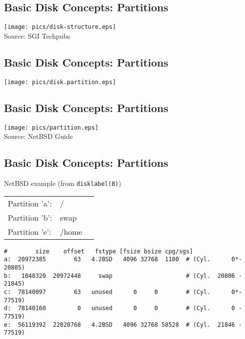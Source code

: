 \documentclass[xga]{xdvislides}
\begin{document}
\subsection{Basic Disk Concepts: Partitions}
	\begin{center}
		\texttt{[image: pics/disk-structure.eps]} \\
		\tiny Source: SGI Techpubs \\
	\end{center}

\subsection{Basic Disk Concepts: Partitions}
	\begin{center}
		\texttt{[image: pics/disk.partition.eps]}
	\end{center}


\subsection{Basic Disk Concepts: Partitions}
	\begin{center}
		\texttt{[image: pics/partition.eps]} \\
		\tiny Source: NetBSD Guide \\
	\end{center}

\subsection{Basic Disk Concepts: Partitions}
NetBSD example (from {\tt disklabel(8)})

\begin{tabular}{ l l c }
Partition 'a': & / & \\
Partition 'b': & swap & \\
Partition 'e': & /home & \\
\end{tabular}

\begin{verbatim}
#        size    offset   fstype [fsize bsize cpg/sgs]
a:  20972385        63   4.2BSD   4096 32768  1180  # (Cyl.      0*- 20805)
b:   1048320  20972448     swap                     # (Cyl.  20806 - 21845)
c:  78140097        63   unused      0     0        # (Cyl.      0*- 77519)
d:  78140160         0   unused      0     0        # (Cyl.      0 - 77519)
e:  56119392  22020768   4.2BSD   4096 32768 58528  # (Cyl.  21846 - 77519)
\end{verbatim}
\end{document}

